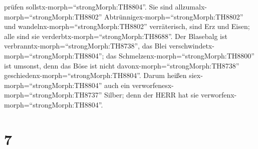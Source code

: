 prüfen sollstx-morph=``strongMorph:TH8804''.  Sie sind
allzumalx-morph=``strongMorph:TH8802''
Abtrünnigex-morph=``strongMorph:TH8802'' und
wandelnx-morph=``strongMorph:TH8802'' verräterisch, sind Erz und Eisen;
alle sind sie verderbtx-morph=``strongMorph:TH8688''.  Der
Blasebalg ist verbranntx-morph=``strongMorph:TH8738'', das Blei
verschwindetx-morph=``strongMorph:TH8804''; das
Schmelzenx-morph=``strongMorph:TH8800'' ist umsonst, denn das Böse ist
nicht davonx-morph=``strongMorph:TH8738''
geschiedenx-morph=``strongMorph:TH8804''.  Darum heißen
siex-morph=``strongMorph:TH8804'' auch ein
verworfenesx-morph=``strongMorph:TH8737'' Silber; denn der HERR hat sie
verworfenx-morph=``strongMorph:TH8804''.

\hypertarget{section-6}{%
\section{7}\label{section-6}}

